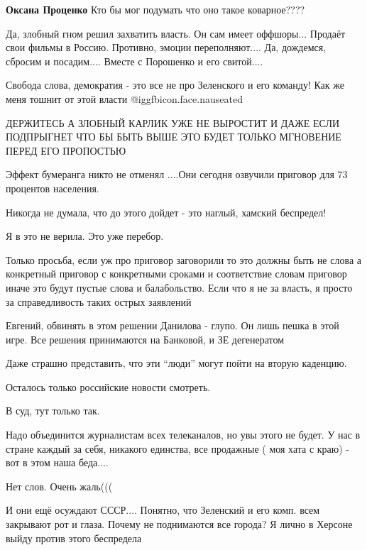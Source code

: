 \begin{itemize}
\textbf{Оксана Проценко} Кто бы мог подумать что оно такое коварное????


Да, злобный гном решил захватить власть. Он сам имеет оффшоры... Продаёт свои
фильмы в Россию. Противно, эмоции переполняют.... Да, дождемся, сбросим и
посадим.... Вместе с Порошенко и его свитой....


Свобода слова, демократия - это все не про Зеленского и его команду! Как же
меня тошнит от этой власти  @igg{fbicon.face.nauseated} 


ДЕРЖИТЕСЬ А ЗЛОБНЫЙ КАРЛИК УЖЕ НЕ ВЫРОСТИТ И ДАЖЕ ЕСЛИ ПОДПРЫГНЕТ ЧТО БЫ БЫТЬ
ВЫШЕ ЭТО БУДЕТ ТОЛЬКО МГНОВЕНИЕ ПЕРЕД ЕГО ПРОПОСТЬЮ

Эффект бумеранга никто не отменял ....Они сегодня озвучили приговор для 73 процентов населения.

Никогда не думала, что до этого дойдет - это наглый, хамский беспредел!

Я в это не верила. Это уже перебор.


Только просьба, если уж про приговор заговорили то это должны быть не слова а
конкретный приговор с конкретными сроками и соответствие словам приговор иначе
это будут пустые слова и балабольство. Если что я не за власть, я просто за
справедливость таких острых заявлений


Евгений, обвинять в этом решении Данилова - глупо. Он лишь пешка в этой игре.
Все решения принимаются на Банковой, и ЗЕ дегенератом

Даже страшно представить, что эти \enquote{люди} могут пойти на вторую каденцию.

Осталось только российские новости смотреть.

В суд, тут только так.


Надо объединится журналистам всех телеканалов, но увы этого не будет. У нас в
стране каждый за себя, никакого единства, все продажные ( моя хата с краю) -
вот в этом наша беда....

Нет слов. Очень жаль(((


И они ещё осуждают СССР.... Понятно, что Зеленский и его комп. всем закрывают
рот и глаза. Почему не поднимаются все города? Я лично в Херсоне выйду против
этого беспредела


\end{itemize} %

